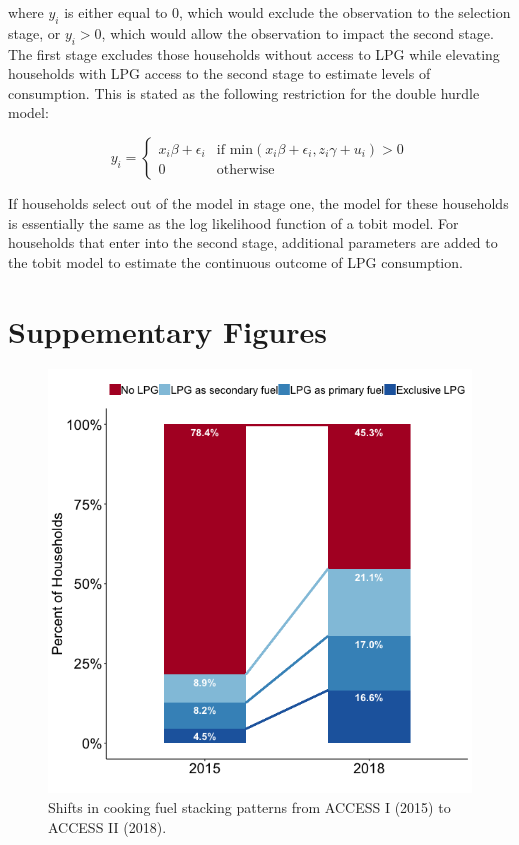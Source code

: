 \documentclass[11pt]{article}
\begin{document}
where $y_i$ is either equal to $0$, which would exclude the observation to the selection stage, or $y_i > 0$, which would allow the observation to impact the second stage. The first stage excludes those households without access to LPG while elevating households with LPG access to the second stage to estimate levels of consumption. This is stated as the following restriction for the double hurdle model:

\begin{equation}
y_i = \left\{ \begin{array}{cl} x_i \beta + \epsilon_i & \textrm{if min} (x_i \beta +\epsilon_i, z_i\gamma+u_i) > 0 \\
0 & \textrm{otherwise} \end{array}\right.
\end{equation}

If households select out of the model in stage one, the model for these households is essentially the same as the log likelihood function of a tobit model. For households that enter into the second stage, additional parameters are added to the tobit model to estimate the continuous outcome of LPG consumption.

\clearpage

\section{Suppementary Figures}
\label{sect:robustness}

\begin{figure}[h!]
\centering
\includegraphics[scale=0.66]{Figures/Descriptive_Statistics/LPGCategories20152018.png}
\caption{Shifts in cooking fuel stacking patterns from ACCESS I (2015) to ACCESS II (2018).}
\label{bar_fuel_stack}
\end{figure}
\end{document}
